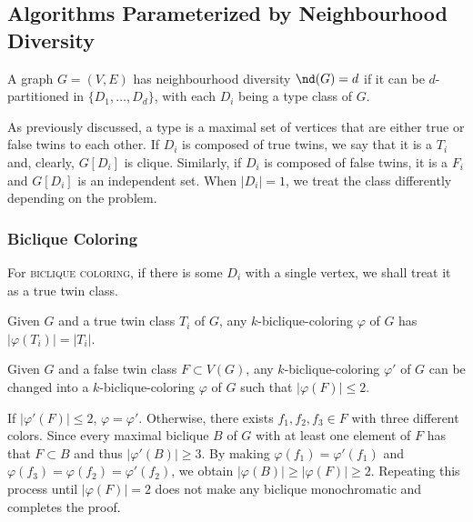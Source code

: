 \subsection{Algorithms Parameterized by Neighbourhood Diversity}

\begin{definition}
    A graph $G = (V,E)$ has neighbourhood diversity $\nd(G) = d$ if it can be $d$-partitioned in $\{D_1, \dots, D_d\}$, with each $D_i$ being a type class of $G$.
\end{definition}

As previously discussed, a type is a maximal set of vertices that are either true or false twins to each other.
If $D_i$ is composed of true twins, we say that it is a  $T_i$ and, clearly, $G[D_i]$ is clique.
Similarly, if $D_i$ is composed of false twins, it is a  $F_i$ and $G[D_i]$ is an independent set.
When $|D_i| = 1$, we treat the class differently depending on the problem.

\subsubsection{Biclique Coloring}

For \textsc{biclique coloring}, if there is some $D_i$ with a single vertex, we shall treat it as a true twin class.

\begin{observation}
    \label{obs:biclique_true_twins}
    Given $G$ and a true twin class $T_i$ of $G$, any $k$-biclique-coloring $\varphi$ of $G$ has $|\varphi(T_i)| = |T_i|$.
\end{observation}

\begin{lemma}
    \label{lem:biclique_false_twins}
    Given $G$ and a false twin class $F \subset V(G)$, any  $k$-biclique-coloring $\varphi'$ of $G$ can be changed into a $k$-biclique-coloring $\varphi$ of $G$ such that $|\varphi(F)| \leq 2$.
\end{lemma}

\begin{tproof}
    If $|\varphi'(F)| \leq 2$, $\varphi = \varphi'$.
    Otherwise, there exists $f_1, f_2, f_3 \in F$ with three different colors. 
    Since every maximal biclique $B$ of $G$ with at least one element of $F$ has that $F \subset B$ and thus $|\varphi'(B)| \geq 3$.
    By making $\varphi(f_1) = \varphi'(f_1)$ and $\varphi(f_3) = \varphi(f_2) = \varphi'(f_2)$, we obtain $|\varphi(B)| \geq |\varphi(F)| \geq 2$.
    Repeating this process until $|\varphi(F)| = 2$ does not make any biclique monochromatic and completes the proof.
\end{tproof}

